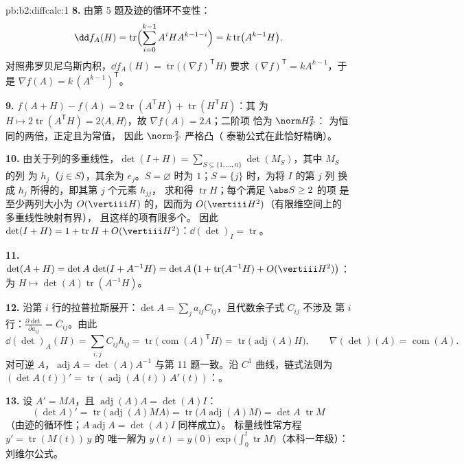 \begin{solution}{pb:b2:diffcalc:1}
\textbf{8.} 由第 5 题及迹的循环不变性：
\[
\dd f_A(H) = \operatorname{tr}\Bigl(\sum_{i=0}^{k-1}
A^iHA^{k-1-i}\Bigr) = k\operatorname{tr}\bigl(A^{k-1}H\bigr) .
\]
对照弗罗贝尼乌斯内积，$\dd f_A(H) =
\operatorname{tr}\bigl((\nabla f)^{\mathsf T}H\bigr)$ 要求
$(\nabla f)^{\mathsf T} = kA^{k-1}$，于是 $\nabla f(A) =
k\,(A^{k-1})^{\mathsf T}$。

\textbf{9.} $f(A + H) - f(A) = 2\operatorname{tr}
(A^{\mathsf T}H) + \operatorname{tr}(H^{\mathsf T}H)$：其
为 $H \mapsto 2\operatorname{tr}(A^{\mathsf T}H) =
2\langle A, H\rangle$，故 $\nabla f(A) = 2A$；二阶项
恰为 $\norm H_F^2$：
为恒同的两倍，正定且为常值，
因此 $\norm\cdot_F^2$ 严格凸（
泰勒公式在此恰好精确）。

\textbf{10.} 由关于列的多重线性，$\det(I + H) =
\sum_{S\subseteq\{1,\dots,n\}}\det(M_S)$，其中 $M_S$ 的列
为 $h_j$（$j \in S$），其余为 $e_j$。$S = \varnothing$
时为 $1$；$S = \{j\}$ 时，为将 $I$ 的第 $j$ 列
换成 $h_j$ 所得的，即其第 $j$ 个元素 $h_{jj}$，
求和得 $\operatorname{tr}H$；每个满足 $\abs S \geq 2$ 的项
是至少两列大小为
$O(\vertiii H)$ 的，因而为 $O(\vertiii H^2)$（有限维空间上的多重线性映射有界），
且这样的项有限多个。
因此 $\det(I + H) = 1 + \operatorname{tr}H +
O(\vertiii H^2)$：$\dd(\det)_I = \operatorname{tr}$。

\textbf{11.} $\det(A + H) = \det A\,\det(I + A^{-1}H) =
\det A\,\bigl(1 + \operatorname{tr}(A^{-1}H) +
O(\vertiii H^2)\bigr)$：为 $H \mapsto
\det(A)\operatorname{tr}(A^{-1}H)$。

\textbf{12.} 沿第 $i$ 行的拉普拉斯展开：$\det A =
\sum_j a_{ij}C_{ij}$，且代数余子式 $C_{ij}$ 不涉及
第 $i$ 行：$\frac{\partial\det}{\partial a_{ij}} = C_{ij}$。由此
\[
\dd(\det)_A(H) = \sum_{i,j}C_{ij}h_{ij}
= \operatorname{tr}\bigl(\operatorname{com}(A)^{\mathsf T}
H\bigr)
= \operatorname{tr}\bigl(\operatorname{adj}(A)H\bigr),
\qquad
\nabla(\det)(A) = \operatorname{com}(A) .
\]
对可逆 $A$，$\operatorname{adj}A = \det(A)A^{-1}$
与第 11 题一致。沿 $C^1$ 曲线，链式法则为
$(\det A(t))' = \operatorname{tr}(\operatorname{adj}
(A(t))\,A'(t))$：。

\textbf{13.} 设 $A' = MA$，且
$\operatorname{adj}(A)A = \det(A)I$：
\[
(\det A)' = \operatorname{tr}\bigl(\operatorname{adj}(A)MA
\bigr)
= \operatorname{tr}\bigl(A\operatorname{adj}(A)M\bigr)
= \det A\;\operatorname{tr}M
\]
（由迹的循环性；$A\operatorname{adj}A = \det(A) I$ 同样成立）。
标量线性常方程 $y' = \operatorname{tr}(M(t))\,y$ 的
唯一解为 $y(t) = y(0)\exp\bigl(\int_0^t
\operatorname{tr}M\bigr)$（本科一年级）：刘维尔公式。


\end{solution}
